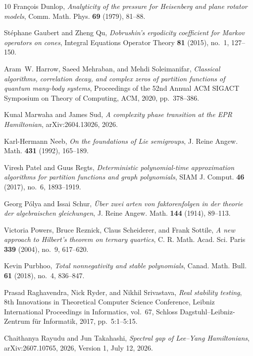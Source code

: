 \documentclass[reqno]{amsart}
\theoremstyle{definition}
\theoremstyle{remark}
\begin{document}
\begin{thebibliography}{10}
Fran{\c c}ois Dunlop, \emph{Analyticity of the pressure for {Heisenberg} and
  plane rotator models}, Comm. Math. Phys. \textbf{69} (1979), 81--88.

St{\'e}phane Gaubert and Zheng Qu, \emph{{Dobrushin}'s ergodicity coefficient
  for {Markov} operators on cones}, Integral Equations Operator Theory
  \textbf{81} (2015), no.~1, 127--150.

Aram~W. Harrow, Saeed Mehraban, and Mehdi Soleimanifar, \emph{Classical
  algorithms, correlation decay, and complex zeros of partition functions of
  quantum many-body systems}, Proceedings of the 52nd Annual {ACM SIGACT}
  Symposium on Theory of Computing, ACM, 2020, pp.~378--386.

Kunal Marwaha and James Sud, \emph{A complexity phase transition at the {EPR
  Hamiltonian}}, arXiv:2604.13026, 2026.

Karl-Hermann Neeb, \emph{On the foundations of {Lie} semigroups}, J. Reine
  Angew. Math. \textbf{431} (1992), 165--189.

Viresh Patel and Guus Regts, \emph{Deterministic polynomial-time approximation
  algorithms for partition functions and graph polynomials}, SIAM J. Comput.
  \textbf{46} (2017), no.~6, 1893--1919.

Georg P{\'o}lya and Issai Schur, \emph{{\"U}ber zwei arten von faktorenfolgen
  in der theorie der algebraischen gleichungen}, J. Reine Angew. Math.
  \textbf{144} (1914), 89--113.

Victoria Powers, Bruce Reznick, Claus Scheiderer, and Frank Sottile, \emph{A
  new approach to {Hilbert}'s theorem on ternary quartics}, C. R. Math. Acad.
  Sci. Paris \textbf{339} (2004), no.~9, 617--620.

Kevin Purbhoo, \emph{Total nonnegativity and stable polynomials}, Canad. Math.
  Bull. \textbf{61} (2018), no.~4, 836--847.

Prasad Raghavendra, Nick Ryder, and Nikhil Srivastava, \emph{Real stability
  testing}, 8th Innovations in Theoretical Computer Science Conference, Leibniz
  International Proceedings in Informatics, vol.~67, Schloss
  Dagstuhl--Leibniz-Zentrum f{\"u}r Informatik, 2017, pp.~5:1--5:15.

Chaithanya Rayudu and Jun Takahashi, \emph{Spectral gap of {Lee--Yang
  Hamiltonians}}, arXiv:2607.10765, 2026, Version 1, July 12, 2026.


\end{thebibliography}
\end{document}
